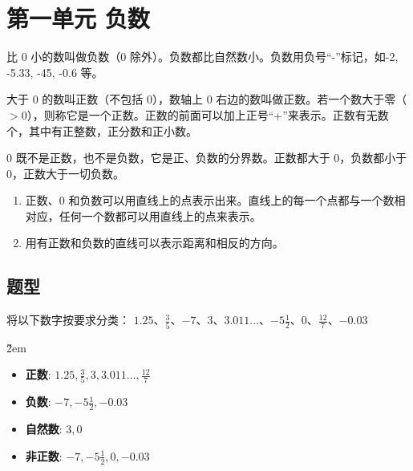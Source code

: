 \section*{第一单元 负数}

\begin{definition}[负数]
    比 0 小的数叫做负数（0 除外）。负数都比自然数小。负数用负号“-”标记，如-2, -5.33, -45, -0.6 等。
\end{definition}

\begin{definition}[正数]
    大于 0 的数叫正数（不包括 0），数轴上 0 右边的数叫做正数。若一个数大于零（$>0$），则称它是一个正数。正数的前面可以加上正号“+”来表示。正数有无数个，其中有正整数，正分数和正小数。
\end{definition}

\begin{definition}[0]
    0 既不是正数，也不是负数，它是正、负数的分界数。正数都大于 0，负数都小于 0，正数大于一切负数。
\end{definition}

\begin{theorem}[在直线上表示数]
    \begin{enumerate}
        \item 正数、0 和负数可以用直线上的点表示出来。直线上的每一个点都与一个数相对应，任何一个数都可以用直线上的点来表示。
        \item 用有正数和负数的直线可以表示距离和相反的方向。
    \end{enumerate}
\end{theorem}

\subsection*{题型}
\begin{example}
    将以下数字按要求分类：
    $1.25$、$ \frac{3}{5}$、$-7$、$3$、$3.011\dots$、$-5\frac{1}{2}$、$0$、$\frac{12}{7}$、$-0.03$
\end{example}

\v{2em}

\begin{solution}
    \begin{itemize}
        \item \textbf{正数}: $1.25, \frac{3}{5}, 3, 3.011\dots, \frac{12}{7}$
        \item \textbf{负数}: $-7, -5\frac{1}{2}, -0.03$
        \item \textbf{自然数}: $3, 0$
        \item \textbf{非正数}: $-7, -5\frac{1}{2}, 0, -0.03$
    \end{itemize}
\end{solution}

